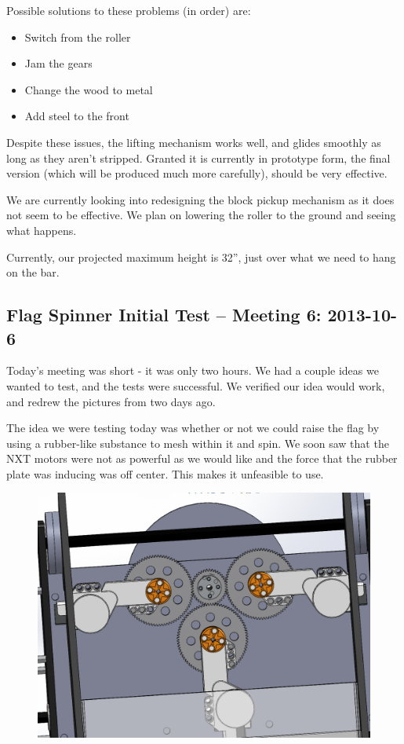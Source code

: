 Possible solutions to these problems (in order) are:
\begin{itemize}
\item Switch from the roller
\item Jam the gears
\item Change the wood to metal
\item Add steel to the front
\end{itemize}

Despite these issues, the lifting mechanism works well, and glides smoothly as long as they aren't stripped. Granted it is currently in prototype form, the final version (which will be produced much more carefully), should be very effective.

We are currently looking into redesigning the block pickup mechanism as it does not seem to be effective. We plan on lowering the roller to the ground and seeing what happens. 

Currently, our projected maximum height is 32”, just over what we need to hang on the bar.

\newpage \subsection{Flag Spinner Initial Test -- Meeting 6: 2013-10-6}
Today's meeting was short - it was only two hours. We had a couple ideas we wanted to test, and the tests were successful. We verified our idea would work, and redrew the pictures from two days ago.

The idea we were testing today was whether or not we could raise the flag by using a rubber-like substance to mesh within it and spin. We soon saw that the NXT motors were not as powerful as we would like and the force that the rubber plate was inducing was off center. This makes it unfeasible to use. 

\begin{figure}[H]
\begin{center}
\includegraphics[scale=0.25]{images/FlagSpinnerV1.png}
\end{center}
\end{figure}


